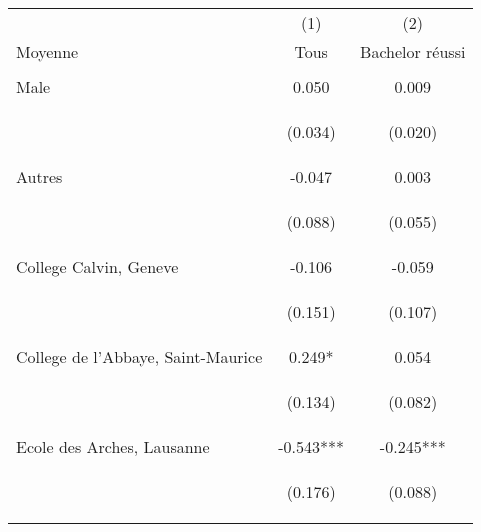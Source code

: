 \begin{tabular}{lcc} \hline
 & (1) & (2) \\
Moyenne & Tous & Bachelor réussi \\ \hline
\vspace{4pt} & \begin{footnotesize}\end{footnotesize} & \begin{footnotesize}\end{footnotesize} \\
Male & 0.050 & 0.009 \\
\vspace{4pt} & \begin{footnotesize}(0.034)\end{footnotesize} & \begin{footnotesize}(0.020)\end{footnotesize} \\
Autres & -0.047 & 0.003 \\
\vspace{4pt} & \begin{footnotesize}(0.088)\end{footnotesize} & \begin{footnotesize}(0.055)\end{footnotesize} \\
College Calvin, Geneve & -0.106 & -0.059 \\
\vspace{4pt} & \begin{footnotesize}(0.151)\end{footnotesize} & \begin{footnotesize}(0.107)\end{footnotesize} \\
College de l'Abbaye, Saint-Maurice & 0.249* & 0.054 \\
\vspace{4pt} & \begin{footnotesize}(0.134)\end{footnotesize} & \begin{footnotesize}(0.082)\end{footnotesize} \\
Ecole des Arches, Lausanne & -0.543*** & -0.245*** \\
\vspace{4pt} & \begin{footnotesize}(0.176)\end{footnotesize} & \begin{footnotesize}(0.088)\end{footnotesize} \\

\end{tabular}
